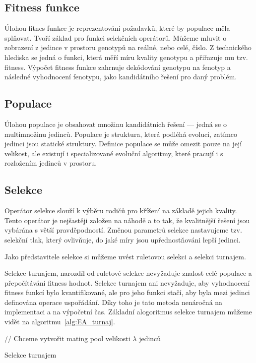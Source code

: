 \subsection{Fitness funkce}
Úlohou fitnes funkce je reprezentování požadavků, které by populace měla splňovat.
Tvoří základ pro funkci selekčních operátorů.
Můžeme mluvit o zobrazení z jedince v prostoru genotypů na reálné, nebo celé, číslo.
Z technického hlediska se jedná o funkci, která měří míru kvality genotypu a přiřazuje mu tzv. fitness.
Výpočet fitness funkce zahrnuje dekódování genotypu na fenotyp a následné vyhodnocení fenotypu, jako kandidátního řešení pro daný problém.

\subsection{Populace}
Úlohou populace je obsahovat množinu kandidátních řešení --- jedná se o multimnožinu jedinců.
Populace je struktura, která podléhá evoluci, zatímco jedinci jsou statické struktury.
Definice populace se může omezit pouze na její velikost, ale existují i specializované evoluční algoritmy, které pracují i s rozložením jedinců v prostoru.


\subsection{Selekce}
Operátor selekce slouží k výběru rodičů pro křížení na základě jejich kvality.
Tento operátor je nejšastěji založen na náhodě a to tak, že kvalitnější řešení jsou vybárána s větší pravděpodností.
Změnou parametrů selekce nastavujeme tzv. selekční tlak, který ovlivňuje, do jaké míry jsou upřednostňováni lepší jedinci.

Jako představitele selekce si můžeme uvést ruletovou selekci a selekci turnajem.

Selekce turnajem, narozdíl od ruletové selekce nevyžaduje znalost celé populace a přepočítávání fitness hodnot.
Selekce turnajem ani nevyžaduje, aby vyhodnocení fitness funkcí bylo kvantifikované, ale pro jeho funkci stačí, aby byla mezi jedinci definována operace uspořádání.
Díky toho je tato metoda nenáročná na implementaci a na výpočetní čas.
Základní alogoritmus selekce turnajem můžeme vidět na algoritmu~\ref{alg:EA_turnaj}.

\begin{algorithm}[H]
    // Chceme vytvořit mating pool velikosti $\lambda$ jedinců\;
    \caption{Selekce turnajem}
    \label{alg:EA_turnaj}
\end{algorithm}

